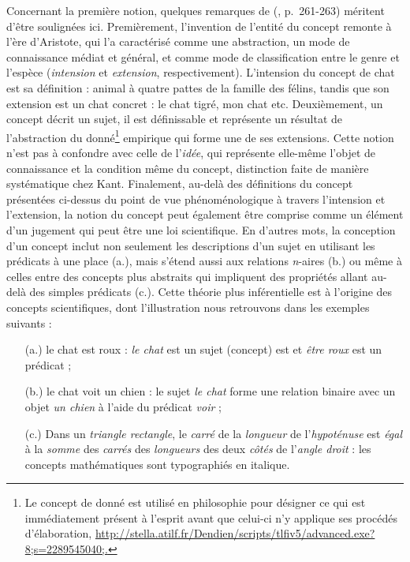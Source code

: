 Concernant la première notion, quelques remarques de \citeauthor{Lecourt1999} (\citeyear{Lecourt1999}, p.~261-263) méritent d'être soulignées ici. Premièrement, l'invention de l'entité du concept remonte à l'ère d'Aristote, qui l'a caractérisé comme une abstraction, un mode de connaissance médiat et général, et comme mode de classification entre le genre et l'espèce (\textit{intension} et \textit{extension}, respectivement). L'intension du concept de chat est sa définition : \og{}animal à quatre pattes de la famille des félins\fg{}, tandis que son extension est un chat concret : le chat tigré, mon chat etc. Deuxièmement, un concept décrit un sujet, il est définissable et représente un résultat de l'abstraction du donné\footnote{Le concept de \og{}donné\fg{} est utilisé en philosophie pour désigner \og{}ce qui est immédiatement présent à l'esprit avant que celui-ci n'y applique ses procédés d'élaboration\fg{}, \url{http://stella.atilf.fr/Dendien/scripts/tlfiv5/advanced.exe?8;s=2289545040;.}} empirique qui forme une de ses extensions. Cette notion n'est pas à confondre avec celle de l'\textit{idée}, qui représente elle-même l'objet de connaissance et la condition même du concept, distinction faite de manière systématique chez Kant. Finalement, au-delà des définitions du concept présentées ci-dessus du point de vue phénoménologique à travers l'intension et l'extension, la notion du concept peut également être comprise comme un élément d'un jugement qui peut être une loi scientifique. En d'autres mots, la conception d'un concept inclut non seulement les descriptions d'un sujet en utilisant les prédicats à une place (a.), mais s'étend aussi aux relations \textit{n}-aires (b.) ou même à celles entre des concepts plus abstraits qui impliquent des propriétés allant au-delà des simples prédicats (c.). Cette théorie plus \og{}inférentielle\fg{} est à l'origine des concepts scientifiques, dont l'illustration nous retrouvons dans les exemples suivants :
\begin{itemize}
\item[\quad (a.)] \og{}le chat est roux\fg{} : \textit{le chat} est un sujet (concept) est et \textit{être roux} est un prédicat ;
\item[\quad (b.)] \og{}le chat voit un chien\fg{} : le sujet \textit{le chat} forme une relation binaire avec un objet \textit{un chien} à l'aide du prédicat \textit{voir} ;
\item[\quad (c.)] \og{}Dans un \textit{triangle rectangle}, le \textit{carré} de la \textit{longueur} de l'\textit{hypoténuse} est \textit{égal} à la \textit{somme} des \textit{carrés} des \textit{longueurs} des deux \textit{côtés} de l'\textit{angle droit}\fg{} : les concepts mathématiques sont typographiés en italique.
\end{itemize}
\medskip

